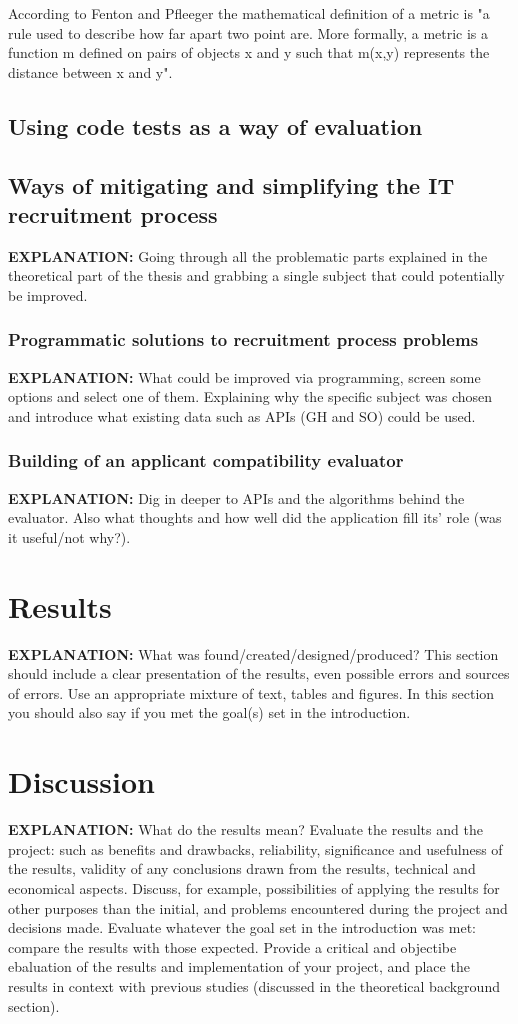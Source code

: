 \documentclass[11pt,a4paper,oneside,article]{memoir}
\begin{document}
According to Fenton and Pfleeger \cite{fenton_pfleeger:book} the mathematical definition of a metric is "a rule
used to describe how far apart two point are. More formally, a metric is a function m defined
on pairs of objects x and y such that m(x,y) represents the distance between x and y".

\section{Using code tests as a way of evaluation}
\section{Ways of mitigating and simplifying the IT recruitment process}
\textbf{EXPLANATION:} Going through all the problematic parts explained in the theoretical part of the thesis and grabbing a single subject that could potentially be improved.

\subsection{Programmatic solutions to recruitment process problems}
\textbf{EXPLANATION:} What could be improved via programming, screen some options and select one of them. Explaining why the specific subject was chosen and introduce what existing data such as APIs (GH and SO) could be used.

\subsection{Building of an applicant compatibility evaluator}
\textbf{EXPLANATION:} Dig in deeper to APIs and the algorithms behind the evaluator. Also what thoughts and how well did the application fill its’ role (was it useful/not why?).
\chapter{Results}
\textbf{EXPLANATION:} What was found/created/designed/produced? This section should include a clear presentation of the results, even possible errors and sources of errors. Use an appropriate mixture of text, tables and figures. In this section you should also say if you met the goal(s) set in the introduction.
\chapter{Discussion}
\textbf{EXPLANATION:} What do the results mean? Evaluate the results and the project: such as benefits and drawbacks, reliability, significance and usefulness of the results, validity of any conclusions drawn from the results, technical and economical aspects. Discuss, for example, possibilities of applying the results for other purposes than the initial, and problems encountered during the project and decisions made. Evaluate whatever the goal set in the introduction was met: compare the results with those expected. Provide a critical and objectibe ebaluation of the results and implementation of your project, and place the results in context with previous studies (discussed in the theoretical background section).
\end{document}
